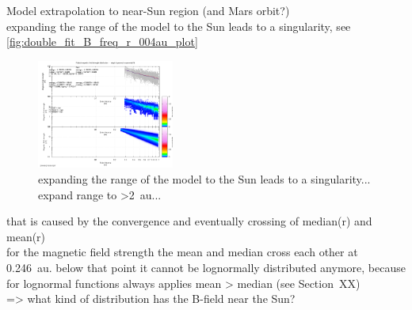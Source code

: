 Model extrapolation to near-Sun region (and Mars orbit?)\\

expanding the range of the model to the Sun leads to a singularity, see \autoref{fig:double_fit_B_freq_r_004au_plot}
\begin{figure}[htb]
	\centering
	\includegraphics[width=0.4\textwidth]{images/gnuplots/double_fit_B_freq_r_004au_plot.png}
	\caption{expanding the range of the model to the Sun leads to a singularity... expand range to >2~au...}
	\label{fig:double_fit_B_freq_r_004au_plot}
\end{figure}
that is caused by the convergence and eventually crossing of median(r) and mean(r)\\

for the magnetic field strength the mean and median cross each other at 0.246~au. below that point it cannot be lognormally distributed anymore, because for lognormal functions always applies mean > median (see Section~XX)\\
=> what kind of distribution has the B-field near the Sun?\\



